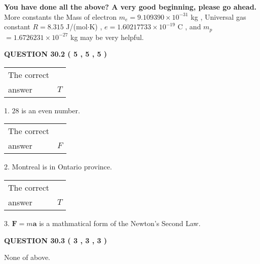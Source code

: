 \documentclass[12pt]{article}
\begin{document}
 
 
   
   
\vspace{0.3in}
{\textbf{\LARGE{You have done all the above? A very good beginning, please go ahead.}}}
More constants the
Mass of electron
$m_e$$ =
9.109390 \times 10^{-31} $
kg
,
Universal gas constant
$R$$ =
8.315 $
J/(mol$\cdot $K)
,
$e$$ =
1.60217733 \times 10^{-19} $
C
, and
$m_p$$ =
1.6726231 \times 10^{-27} $
kg
%
may be very helpful.
\vspace{0.3in}
   
   
  
\vspace{0.2in}
  
{\textbf{\Large{QUESTION
30.2 
 (           5 ,           5 ,           5 )
}}}
  
  
 
 
\noindent{}

 
\noindent\begin{tabular}{|l|l|}\hline The correct & \\
          answer &  %
$T$ \\ \hline \end{tabular}
1. $ %
28$ is an  %
even number.
 
\noindent\begin{tabular}{|l|l|}\hline The correct & \\
          answer &  %
$F$ \\ \hline \end{tabular}
2.  %
Montreal is in  %
Ontario province.
 
\noindent\begin{tabular}{|l|l|}\hline The correct & \\
          answer &  %
$T$ \\ \hline \end{tabular}
3.  %
$\mathbf{F}=m\mathbf{a}$ is a mathmatical form of  %
the Newton's Second Law.
 
 
 
  
\vspace{0.2in}
  
{\textbf{\Large{QUESTION
30.3 
 (           3 ,           3 ,           3 )
}}}
  
  
 
 
\noindent{}
 
 
 None of above.
 
\end{document}
